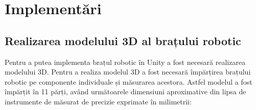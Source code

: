 

\clearpage


\section{Implementări }

\subsection{Realizarea modelului 3D al brațului robotic}
Pentru a putea implementa brațul robotic în Unity a fost necesară realizarea modelului 3D. Pentru a realiza  modelul 3D a fost necesară împărțirea brațului robotic pe componente individuale și măsurarea acestora. Astfel  modelul a fost împărțit în 11 părți, având următoarele dimensiuni aproximative din lipsa de instrumente de măsurat de precizie exprimate în milimetrii:
